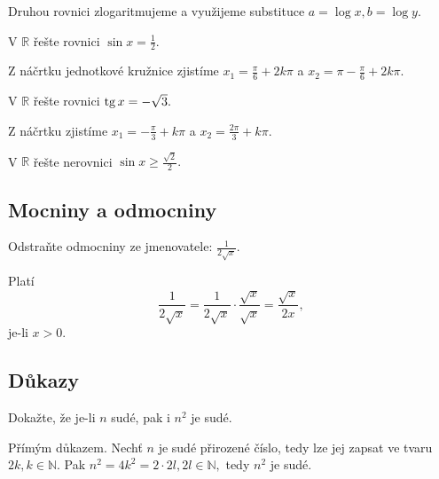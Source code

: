 \begin{reseni}
Druhou rovnici zlogaritmujeme a využijeme substituce $a=\log x, b=\log y.$
\end{reseni}

\begin{priklad}
V $\mathbb R$ řešte rovnici $\sin x = \frac{1}{2}.$
\end{priklad}

\begin{reseni}
Z náčrtku jednotkové kružnice zjistíme $x_1 = \frac{\pi}{6}+2k\pi$ a $x_2=\pi-\frac{\pi}{6}+2k\pi.$
\end{reseni}

\begin{priklad}
V $\mathbb R$ řešte rovnici $\operatorname{tg} x = -\sqrt{3}. $
\end{priklad}

\begin{reseni}
Z náčrtku zjistíme $x_1=-\frac{\pi}{3}+k\pi$ a $x_2=\frac{2\pi}{3}+k\pi.$
\end{reseni}

\begin{priklad}
V $\mathbb R$ řešte nerovnici $\sin x \geq \frac{\sqrt{2} }{2}.$
\end{priklad}

\subsection{Mocniny a odmocniny}
\begin{priklad}
Odstraňte odmocniny ze jmenovatele: $\frac{1}{2 \sqrt{x} }.$
\end{priklad}

\begin{reseni}
Platí
$$\frac{1}{2\sqrt{x} }=\frac{1}{2\sqrt{x} }\cdot \frac{\sqrt{x} }{\sqrt{x} }=\frac{\sqrt{x} }{2x},$$
je-li $x>0.$
\end{reseni}

\subsection{Důkazy}
\begin{priklad}
Dokažte, že je-li $n$ sudé, pak i $n^2$ je sudé.
\end{priklad}

\begin{reseni}\label{dkpr}
Přímým důkazem. Nechť $n$ je sudé přirozené číslo, tedy lze jej zapsat ve tvaru $2k, k \in \mathbb N.$
Pak $n^2 = 4k^2 = 2\cdot 2l, 2l\in \mathbb N, $ tedy $n^2$ je sudé.
\end{reseni}

